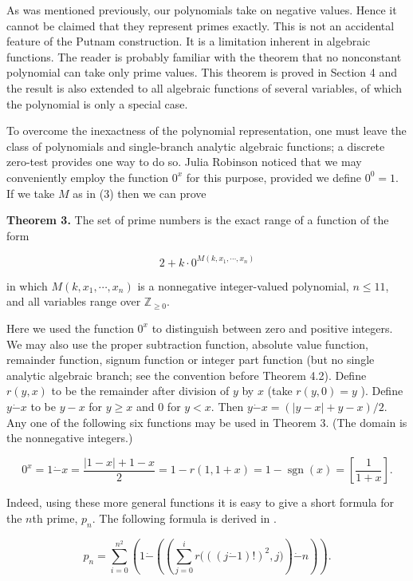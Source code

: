 \documentclass[10pt,letterpaper]{article}
\newcommand{\dotminus}{\mathbin{\dot{-}}}
\newcommand{\Nzero}{\mathbb{Z}_{\geq 0}}
\newcommand{\statement}[1]{\par\medskip\noindent\textbf{#1}\enspace}
\begin{document}
As was mentioned previously, our polynomials take on negative values. Hence it cannot be claimed that they represent primes exactly. This is not an accidental feature of the Putnam construction. It is a limitation inherent in algebraic functions. The reader is probably familiar with the theorem that no nonconstant polynomial can take only prime values. This theorem is proved in Section 4 and the result is also extended to all algebraic functions of several variables, of which the polynomial is only a special case.

To overcome the inexactness of the polynomial representation, one must leave the class of polynomials and single-branch analytic algebraic functions; a discrete zero-test provides one way to do so. Julia Robinson noticed \cite{ref4} that we may conveniently employ the function $0^{x}$ for this purpose, provided we define $0^{0}=1$. If we take $M$ as in (3) then we can prove

\statement{Theorem 3.} The set of prime numbers is the exact range of a function of the form

\[
2+k \cdot 0^{M\left(k, x_{1}, \cdots, x_{n}\right)}
\]

in which $M\left(k, x_{1}, \cdots, x_{n}\right)$ is a nonnegative integer-valued polynomial, $n\leq11$, and all variables range over $\Nzero$.

Here we used the function $0^{x}$ to distinguish between zero and positive integers. We may also use the proper subtraction function, absolute value function, remainder function, signum function or integer part function (but no single analytic algebraic branch; see the convention before Theorem 4.2). Define $r(y, x)$ to be the remainder after division of $y$ by $x$ (take $r(y, 0)=y$ ). Define $y\dotminus x$ to be $y-x$ for $y\geq x$ and $0$ for $y<x$. Then $y\dotminus x=(|y-x|+y-x)/2$. Any one of the following six functions may be used in Theorem 3. (The domain is the nonnegative integers.)

\[
0^{x}=1\dotminus x=\frac{|1-x|+1-x}{2}=1-r(1,1+x)=1-\operatorname{sgn}(x)=\left[\frac{1}{1+x}\right] .
\]

Indeed, using these more general functions it is easy to give a short formula for the $n$th prime, $p_{n}$. The following formula is derived in \cite{ref7}.


\begin{equation*}
p_n=\sum_{i=0}^{n^2}\left(1\dotminus\left(\left(\sum_{j=0}^{i}r\bigl(((j\dotminus1)!)^2,j\bigr)\right)\dotminus n\right)\right). \tag{5}
\end{equation*}
\end{document}

